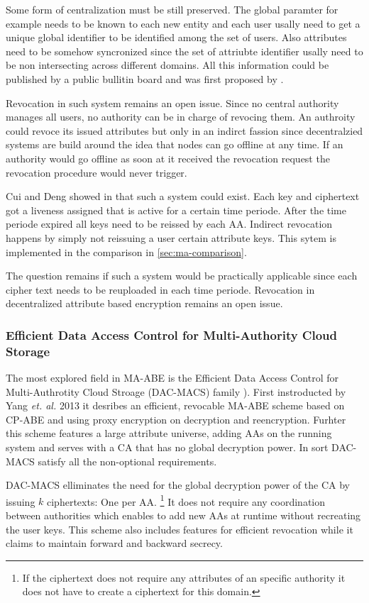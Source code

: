 Some form of centralization must be still preserved. The global paramter for example needs to be known to each new entity and each user usally need to get a unique global identifier to be identified among the set of users. Also attributes need to be somehow syncronized since the set of attriubte identifier usally need to be non intersecting across different domains. All this information could be published by a public bullitin board and was first proposed by \cite{lewko2011decentralizing}. 

Revocation in such system remains an open issue. Since no central authority manages all users, no authority can be in charge of revocing them. An authroity could revoce its issued attributes but only in an indirct fassion since decentralzied systems are build around the idea that nodes can go offline at any time. If an authority would go offline as soon at it received the revocation request the revocation procedure would never trigger. 

Cui and Deng showed in \cite{cui2016revocable} that such a system could exist. Each key and ciphertext got a liveness assigned that is active for a certain time periode. After the time periode expired all keys need to be reissed by each \ac{AA}. Indirect revocation happens by simply not reissuing a user certain attribute keys. This sytem is implemented in the comparison in \ref{sec:ma-comparison}.

The question remains if such a system would be practically applicable since each cipher text needs to be reuploaded in each time periode. Revocation in decentralized attribute based encryption remains an open issue.

\subsubsection{Efficient Data Access Control for Multi-Authority Cloud Storage}
The most explored field in \ac{MA-ABE} is the Efficient Data Access Control for Multi-Authrotity Cloud Stroage (\ac{DAC-MACS}) family \cite{yang2013dac}). First instroducted by Yang \textit{et. al.} 2013 it desribes an efficient, revocable \ac{MA-ABE} scheme based on \ac{CP-ABE} and using proxy encryption on decryption and reencryption. Furhter this scheme features a large attribute universe, adding \ac{AA}s on the running system and serves with a \ac{CA} that has no global decryption power. In sort \ac{DAC-MACS} satisfy all the non-optional requirements.

\ac{DAC-MACS} elliminates the need for the global decryption power of the \ac{CA} by issuing $k$ ciphertexts: One per \ac{AA}. \footnote{If the ciphertext does not require any attributes of an specific authority it does not have to create a ciphertext for this domain.} It does not require any coordination between authorities which enables to add new \ac{AA}s at runtime without recreating the user keys. This scheme also includes features for efficient revocation while it claims to maintain forward and backward secrecy.

